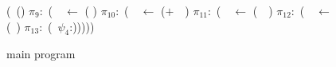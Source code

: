 \begin{wrapfigure}{l}{.28\textwidth}
  \renewcommand{\arraystretch}{.8}{
    \begin{uprogram}
      \UFL (\DEFINE\ (\main)
       \!\!$\pi_9$:\, (\LET\  \pa\  $\leftarrow$
      (
      ) \IN  
       \!\!$\pi_{10}$:\, (\LET\  \pb\  $\leftarrow$ ($+$\ \pa\ \acdr)
      \IN
         \hspace*{.05cm}$\pi_{11}$:\,      (\LET\ \pc\
      $\leftarrow$  (\CONS\ \pb\ \NIL) \IN
         \hspace*{.15cm}    $\pi_{12}$:\,
      (\LET\ \pw\  $\leftarrow$  (\length\ \pc) \IN   {} \hspace*{1.4mm}  $\pi_{13}$:\,
      (\SRETURN~$\psi_4$:\pw)))))
  \end{uprogram}}
  \caption{main program}\label{fig:main-pgm1}
  \vspace{-10pt}
\end{wrapfigure}
